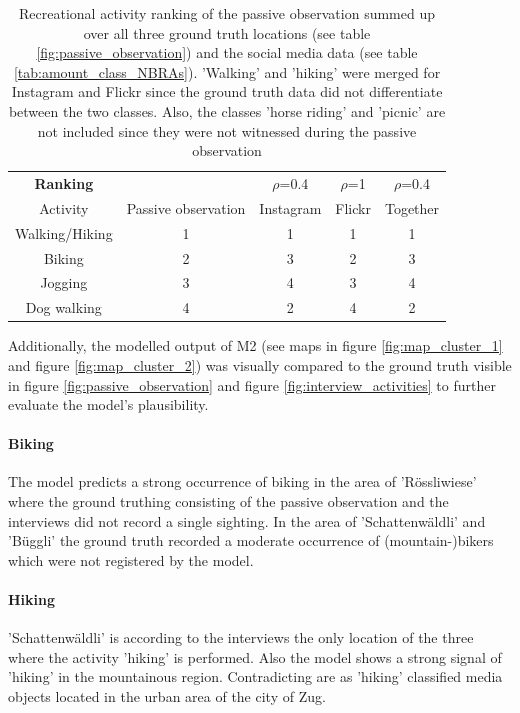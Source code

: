 \begin{table}[h!]
\begin{center}
\caption{Recreational activity ranking of the passive observation summed up over all three ground truth locations (see table \ref{fig:passive_observation}) and the social media data (see table \ref{tab:amount_class_NBRAs}). 'Walking' and 'hiking' were merged for Instagram and Flickr since the ground truth data did not differentiate between the two classes. Also, the classes 'horse riding' and 'picnic' are not included since they were not witnessed during the passive observation}\vspace{1ex}
\label{tab:compare_ranking}
\begin{tabular}{ccccc}\hline
\textbf{\large{Ranking}}  & & $\rho$=0.4 & $\rho$=1 & $\rho$=0.4\\
Activity & Passive observation & Instagram & Flickr & Together\footnotemark\\ \hline
Walking/Hiking & 1 & 1 & 1 & 1\\
Biking & 2 & 3 & 2 & 3 \\
Jogging & 3 & 4 & 3 & 4\\
Dog walking & 4 & 2 & 4 & 2 \\
\hline
\end{tabular}
\end{center}
\end{table}

Additionally, the modelled output of M2 (see maps in figure \ref{fig:map_cluster_1} and figure \ref{fig:map_cluster_2}) was visually compared to the ground truth visible in figure \ref{fig:passive_observation} and figure \ref{fig:interview_activities} to further evaluate the model's plausibility.

\paragraph*{Biking}
The model predicts a strong occurrence of biking in the area of 'R\"ossliwiese' where the ground truthing consisting of the passive observation and the interviews did not record a single sighting. In the area of 'Schattenw\"aldli' and 'B\"uggli' the ground truth recorded a moderate occurrence of (mountain-)bikers which were not registered by the model. 

\paragraph*{Hiking}
'Schattenw\"aldli' is according to the interviews the only location of the three where the activity 'hiking' is performed. Also the model shows a strong signal of 'hiking' in the mountainous region. Contradicting are as 'hiking' classified media objects located in the urban area of the city of Zug.

